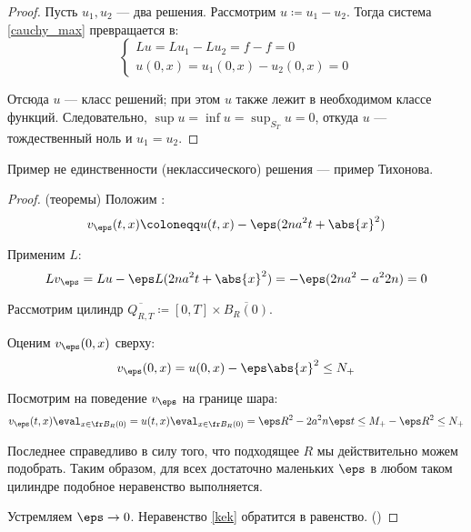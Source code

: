 \begin{proof}
  Пусть $u_1, u_2$ --- два решения. Рассмотрим $u \coloneqq u_1 - u_2$. Тогда система \eqref{cauchy_max} превращается в:
  \begin{equation}
    \left\{\begin{aligned}
      Lu = Lu_1 - Lu_2 = f - f = 0 \\
      u(0, x) = u_1(0, x) - u_2(0, x) = 0
    \end{aligned}\right.
  \end{equation}
  
  Отсюда $u$ --- класс решений; при этом $u$ также лежит в необходимом классе функций. Следовательно, $\sup u = \inf u = \sup_{S_T} u = 0$, откуда $u$ --- тождественный ноль и $u_1 = u_2$.
\end{proof}

\begin{rem}
  Пример не единственности (неклассического) решения --- пример Тихонова.
\end{rem}

\begin{proof}(теоремы)
  Положим :
  \begin{equation}
    v_\eps(t, x) \coloneqq u(t, x) - \eps (2n a^2 t + \abs{x}^2)
  \end{equation}
  
  Применим $L$:
  \begin{equation}
    Lv_\eps = Lu - \eps L (2n a^2 t + \abs{x}^2) = -\eps (2na^2 - a^2 2n) = 0
  \end{equation}
  
  Рассмотрим цилиндр $\overline{Q_{R, T}} \coloneqq [0, T] \times \overline{B_R(0)}$.
  
  Оценим $v_\eps(0, x)$ сверху:
  \begin{equation}
    v_\eps(0, x) = u(0, x) - \eps \abs{x}^2 \le N_+
  \end{equation}
  
  Посмотрим на поведение $v_\eps$ на границе шара:
  \begin{equation}
    v_\eps(t, x) \eval_{x \in \fr B_R(0)} = u(t, x) \eval_{x \in \fr B_R(0)} = \eps R^2 - 2 a^2 n \eps t \le M_+ - \eps R^2 \le N_+ \label{kek}
  \end{equation}
  
  Последнее справедливо в силу того, что подходящее $R$ мы действительно можем подобрать. Таким образом, для всех достаточно маленьких $\eps$ в любом таком цилиндре подобное неравенство выполняется. 
  
  Устремляем $\eps \to 0$. Неравенство \eqref{kek} обратится в равенство. ()
\end{proof}

